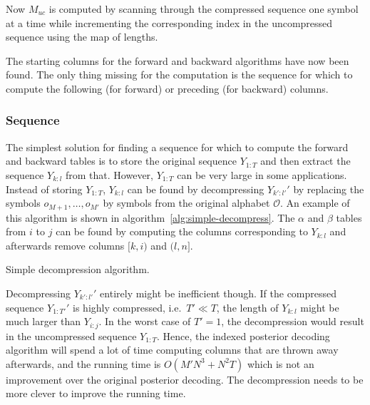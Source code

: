 Now $M_{uc}$ is computed by scanning through the
compressed sequence one symbol at a time while incrementing the corresponding
index in the uncompressed sequence using the map of lengths.

The starting columns for the forward and backward algorithms have now been
found. The only thing missing for the computation is the sequence for which to
compute the following (for forward) or preceding (for backward) columns.

\subsubsection{Sequence}

The simplest solution for finding a sequence for which to compute the forward
and backward tables is to store the original sequence $Y_{1:T}$ and then
extract the sequence $Y_{k:l}$ from that. However, $Y_{1:T}$ can be very large
in some applications. Instead of storing $Y_{1:T}$, $Y_{k:l}$ can be found by
decompressing $Y_{k':l'}'$ by replacing the symbols $o_{M + 1}, \dots, o_{M'}$
by symbols from the original alphabet $\mathcal{O}$. An example of this
algorithm is shown in algorithm~\ref{alg:simple-decompress}. The $\alpha$ and
$\beta$ tables from $i$ to $j$ can be found by computing the columns corresponding to $Y_{k:l}$
and afterwards remove columns $[k, i)$ and $(l, n]$.

\begin{algorithm}
  \caption{Simple decompression algorithm.}
  \label{alg:simple-decompress}
  \begin{algorithmic}[1]
        \EndFor{}
    \EndProcedure{}
  \end{algorithmic}
\end{algorithm}

Decompressing $Y_{k':l'}'$ entirely might be inefficient though. If the
compressed sequence $Y_{1:T'}'$ is highly compressed, i.e.\ $T' \ll T$, the
length of $Y_{k:l}$ might be much larger than $Y_{i:j}$. In the worst case of
$T' = 1$, the decompression would result in the uncompressed sequence
$Y_{1:T}$. Hence, the indexed posterior decoding algorithm will spend a lot of
time computing columns that are thrown away afterwards, and the running time is
$O(M' N^3 + N^2 T)$ which is not an improvement over the original
posterior decoding. The decompression needs to be more clever to improve the
running time.


